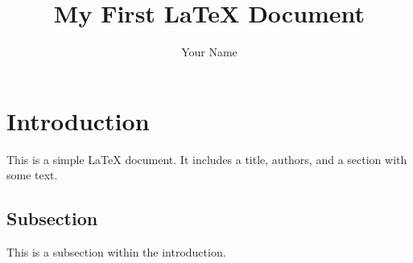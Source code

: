 \documentclass{article}
\title{My First LaTeX Document}
\author{Your Name}
\begin{document}
\maketitle

\section{Introduction}
This is a simple LaTeX document. It includes a title, authors, and a section with some text.

\subsection{Subsection}
This is a subsection within the introduction.
\end{document}
